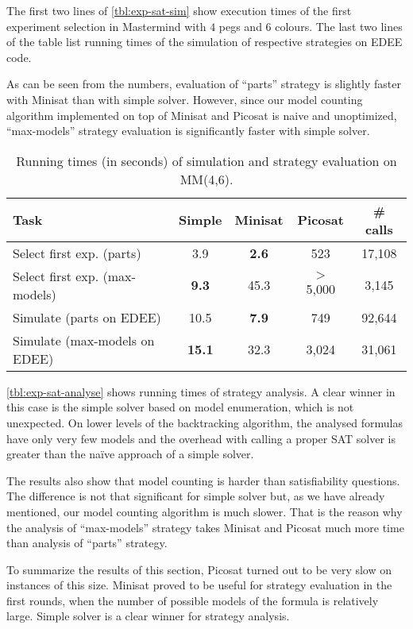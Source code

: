 The first two lines of \autoref{tbl:exp-sat-sim} show execution times of the
  first experiment selection in Mastermind with $4$ pegs and $6$ colours.
The last two lines of the table list running times of the simulation of
  respective strategies on EDEE code.

As can be seen from the numbers, evaluation of ``parts'' strategy is slightly
  faster with Minisat than with simple solver.
However, since our model counting algorithm implemented on top of Minisat and Picosat
  is naive and unoptimized, ``max-models'' strategy evaluation is significantly faster
  with simple solver.

\begin{table}[h]
\begin{center}
\begin{tabular}{|l|c|c|c|c|} \hline
Task & Simple & Minisat & Picosat & \# calls \\ \hline
Select first exp. (parts) & 3.9 & \textbf{2.6} & 523 & 17,108 \\
Select first exp. (max-models) & \textbf{9.3} & 45.3 & $>$ 5,000 & 3,145 \\
Simulate (parts on EDEE) & 10.5 & \textbf{7.9} & 749 & 92,644 \\
Simulate (max-models on EDEE) & \textbf{15.1} & 32.3 & 3,024 & 31,061 \\\hline
\end{tabular}
\caption{Running times (in seconds) of simulation and strategy evaluation on MM(4,6).}
\label{tbl:exp-sat-sim}
\end{center}
\end{table}

\autoref{tbl:exp-sat-analyse}
  shows running times of strategy analysis.
A clear winner in this case is the simple solver based on
  model enumeration,
  which is not unexpected.
On lower levels of the backtracking algorithm,
  the analysed formulas have only very few models and the
  overhead with calling a proper SAT solver is greater
  than the na\"ive approach of a simple solver.

The results also show that model counting is harder than satisfiability questions.
The difference is not that significant for simple solver
 but, as we have already mentioned, our model counting algorithm is much slower.
That is the reason why the analysis of ``max-models'' strategy takes Minisat and Picosat
  much more time than analysis of ``parts'' strategy.

To summarize the results of this section,
Picosat turned out to be very slow on instances of this size. Minisat proved to be
useful for strategy evaluation in the first rounds, when the number of possible
models of the formula is relatively large.
Simple solver is a clear winner for strategy analysis.

